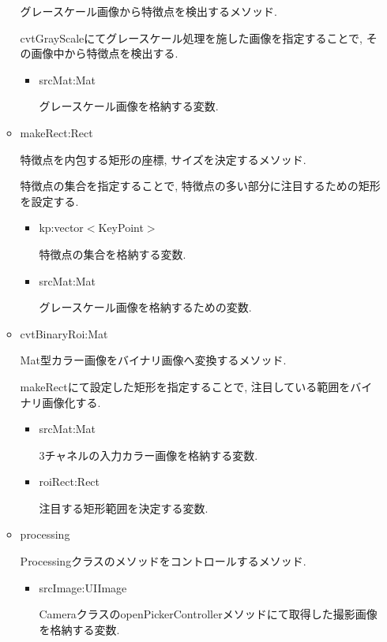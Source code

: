 \begin{itemize}
\begin{itemize}
グレースケール画像から特徴点を検出するメソッド.

cvtGrayScaleにてグレースケール処理を施した画像を指定することで, その画像中から特徴点を検出する.

\begin{itemize}
\item srcMat:Mat

グレースケール画像を格納する変数.
\end{itemize}

\item makeRect:Rect

特徴点を内包する矩形の座標, サイズを決定するメソッド.

特徴点の集合を指定することで, 特徴点の多い部分に注目するための矩形を設定する.

\begin{itemize}
\item kp:vector$<$KeyPoint$>$

特徴点の集合を格納する変数.

\item srcMat:Mat

グレースケール画像を格納するための変数.
\end{itemize}

\item cvtBinaryRoi:Mat

Mat型カラー画像をバイナリ画像へ変換するメソッド.

makeRectにて設定した矩形を指定することで, 注目している範囲をバイナリ画像化する.

\begin{itemize}
\item srcMat:Mat

3チャネルの入力カラー画像を格納する変数.

\item roiRect:Rect

注目する矩形範囲を決定する変数.
\end{itemize}

\item processing

Processingクラスのメソッドをコントロールするメソッド.

\begin{itemize}
\item srcImage:UIImage

CameraクラスのopenPickerControllerメソッドにて取得した撮影画像を格納する変数.
\end{itemize}

\end{itemize}

\end{itemize}


